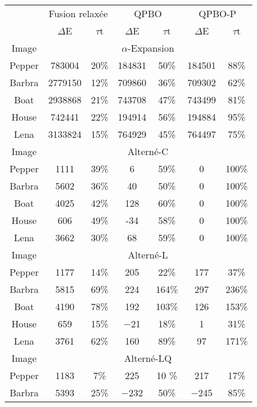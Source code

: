 \documentclass[../main/These_Mathias_Paget.tex]{subfiles}
\begin{document}
\begin{table}
\centering
\begin{tabular}{c|cc|cc|cc}
& \multicolumn{2}{c|}{Fusion relaxée} & \multicolumn{2}{c|}{QPBO} & \multicolumn{2}{c}{QPBO-P} \\
 & $\Delta$E & $\tau$t & $\Delta$E & $\tau$t & $\Delta$E & $\tau$t  \\
\hline
Image & \multicolumn{6}{c}{$\alpha$-Expansion} \\
\hline
Pepper & \num{783004 } &	20\% &	\num{184831} &	50\% &	\num{184501} &	88\% \\
Barbra & \num{2779150} &	12\% &	\num{709860} &	36\% &	\num{709302} &	62\% \\
Boat & \num{2938868} &	21\% &	\num{743708} &	47\% &	\num{743499} & 81\%	 \\
House & \num{742441 } &	22\% &	\num{194914} &	56\% &	\num{194884} &	95\% \\
Lena & \num{3133824} &	15\% &	\num{764929} &	45\% &	\num{764497} &	75\% \\
\hline
Image & \multicolumn{6}{c}{Alterné-C} \\
\hline					
Pepper & \num{1111} &	39\% &	6	& 59\% &	0 &	100\%   \\
Barbra & \num{5602} &	36\% &	40	& 50\% &	0 &	100\%   \\
Boat & \num{4025} &	42\% &	128	& 60\% &	0 &	100\%   \\
House & \num{606 } &	49\% &	-34	& 58\% &	0 &	100\%   \\
Lena & \num{3662} &	30\% &	68	& 59\% &	0 &	100\%   \\
\hline
Image & \multicolumn{6}{c}{Alterné-L} \\
\hline					
Pepper & \num{1177} & 14\% &   \num{205 } & 22\%  &  \num{177 } & 37\%   \\
Barbra  & \num{5815} & 69\% &   \num{224 } & 164\%  &  \num{297 } & 236\%  \\
Boat & \num{4190} & 78\% &   \num{192 } & 103\%  &  \num{126 } & 153\%  \\
House & \num{659 } & 15\% &   \num{-21 } & 18\%  &  \num{1   } & 31\%   \\
Lena & \num{3761} & 62\% &   \num{160 } & 89\%  &  \num{97  }  & 171\%  \\
\hline
Image & \multicolumn{6}{c}{Alterné-LQ} \\
\hline					
Pepper & \num{1183} & 7\% &   \num{225 } & 10 \%   &  \num{217 }  & 17\%   \\
Barbra & \num{5393} & 25\% &   \num{-232} & 50\%  &  \num{-245} & 85\%   \\

\end{tabular}
\end{table}
\end{document}
